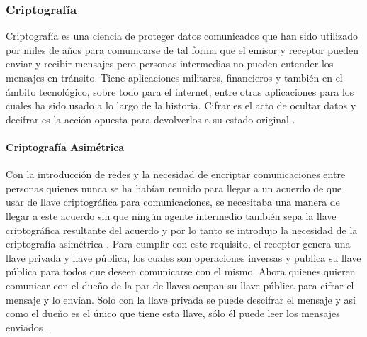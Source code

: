 \subsubsection{Criptografía}
Criptografía es una ciencia de proteger datos comunicados que han sido utilizado por miles de años para comunicarse de tal forma que el emisor y receptor pueden enviar y recibir mensajes pero personas intermedias no pueden entender los mensajes en tránsito. Tiene aplicaciones militares, financieros y también en el ámbito tecnológico, sobre todo para el internet, entre otras aplicaciones para los cuales ha sido usado a lo largo de la historia. Cifrar es el acto de ocultar datos y decifrar es la acción opuesta para devolverlos a su estado original \citep{Khanacademy-What-is-Cryptography}.

\paragraph{Criptografía Asimétrica}
Con la introducción de redes y la necesidad de encriptar comunicaciones entre personas quienes nunca se ha habían reunido para llegar a un acuerdo de que usar de llave criptográfica para comunicaciones, se necesitaba una manera de llegar a este acuerdo sin que ningún agente intermedio también sepa la llave criptográfica resultante del acuerdo y por lo tanto se introdujo la necesidad de la criptografía asimétrica \citep{Khanacademy-RSA-1}. Para cumplir con este requisito, el receptor genera una llave privada y llave pública, los cuales son operaciones inversas y publica su llave pública para todos que deseen comunicarse con el mismo. Ahora quienes quieren comunicar con el dueño de la par de llaves ocupan su llave pública para cifrar el mensaje y lo envían. Solo con la llave privada se puede descifrar el mensaje y así como el dueño es el único que tiene esta llave, sólo él puede leer los mensajes enviados \citep{Khanacademy-RSA-1}.

